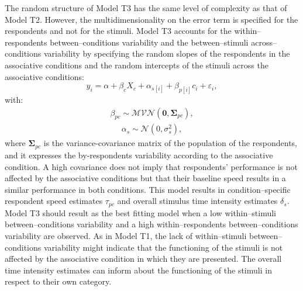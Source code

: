 \documentclass[12pt]{book}
\begin{document}
The random structure of Model T3 has the same level of complexity as that of Model T2. However, the multidimensionality on the error term is specified for the respondents and not for the stimuli. 
Model T3 accounts for the within--respondents between--conditions variability and the between--stimuli across--conditions variability by specifying the random slopes of the respondents in the associative conditions and the random intercepts of the stimuli across the associative conditions: 
%
\begin{equation}\label{logtime3}
	y_{i} = \alpha + \beta_cX_c + \alpha_{s[i]} +  \beta_{p[i]}c_{i} + \varepsilon_{i},
\end{equation}
with:
\begin{align}
	\beta_{pc} \sim \mathcal{MVN}(\bm{0}, \bm{\Sigma}_{pc}),
\end{align}
\begin{align}
	\alpha_s \sim \mathcal{N} (0, \sigma_s^2),
\end{align}
%
where $\bm{\Sigma}_{pc}$ is the variance-covariance matrix of the population of the respondents, and it expresses the by-respondents variability according to the associative condition. A high covariance does not imply that respondents' performance is not affected by the associative conditions but that their baseline speed results in a similar performance in both conditions.
This model results in condition--specific respondent speed estimates $\tau_{pc}$ and overall stimulus time intensity estimates $\delta_s$. 
Model T3 should result as the best fitting model when a low within--stimuli between--conditions variability and a high within--respondents between--conditions variability are observed. 
As in Model T1, the lack of within--stimuli between--conditions variability might indicate that the functioning of the stimuli is not affected by the associative condition in which they are presented. The overall time intensity estimates can  inform about the functioning of the stimuli in respect to their own category. 
\end{document}
